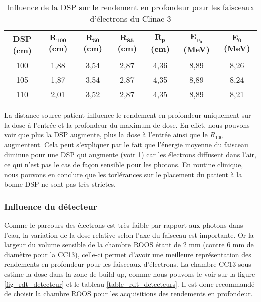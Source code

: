 \documentclass{article}
\begin{document}
\begin{table}[h]
  \centering
  \begin{tabular}{ccccccc}
    \toprule
    \textbf{DSP (cm)} & $\mathbf{R_{100}}$ \textbf{(cm)} & $\mathbf{R_{50}}$ \textbf{(cm)} & $\mathbf{R_{85}}$ \textbf{(cm)} & $\mathbf{R_p}$\textbf{(cm)} & $\mathbf{E_{p_0}}$ \textbf{(MeV)} & $\mathbf{E_0}$ \textbf{(MeV)} \\ \toprule
    100 & 1,88 & 3,54 & 2,87 & 4,36 & 8,89 & 8,26 \\
    105 & 1,87 & 3,54 & 2,87 & 4,35 & 8,89 & 8,24 \\
    110 & 2,01 & 3,52 & 2,87 & 4,35 & 8,89 & 8,21 \\ \bottomrule
  \end{tabular}
  \caption{Influence de la DSP sur le rendement en profondeur pour les faisceaux d'électrons du Clinac 3}
  \label{table_rdt_dsp}
\end{table}

La distance source patient influence le rendement en profondeur uniquement sur la dose à l'entrée et la profondeur du maximum de dose. En effet, nous pouvons voir que plus la DSP augmente, plus la dose à l'entrée ainsi que le $R_{100}$ augmentent. Cela peut s'expliquer par le fait que l'énergie moyenne du faisceau diminue pour une DSP qui augmente (voir \ref*{table_rdt_dsp}) car les électrons diffusent dans l'air, ce qui n'est pas le cas de façon sensible pour les photons. En routine clinique, nous pouvons en conclure que les torlérances sur le placement du patient à la bonne DSP ne sont pas très strictes.

\subsubsection{Influence du détecteur}
\label{partie_detecteurs_rdt}

Comme le parcours des électrons est très faible par rapport aux photons dans l'eau, la variation de la dose relative selon l'axe du faisceau est importante. Or la largeur du volume sensible de la chambre ROOS étant de 2 mm (contre 6 mm de diamètre pour la CC13), celle-ci permet d'avoir une meilleure représentation des rendements en profondeur pour les faisceaux d'électrons. La chambre CC13 sous-estime la dose dans la zone de build-up, comme nous pouvons le voir sur la figure \ref*{fig_rdt_detecteur} et le tableau \ref*{table_rdt_detecteurs}. Il est donc recommandé de choisir la chambre ROOS pour les acquisitions des rendements en profondeur.
\end{document}
